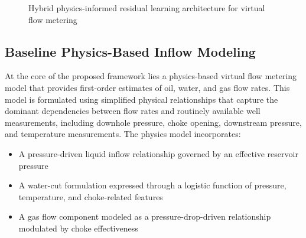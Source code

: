 \documentclass[12pt,APA]{uomthesis}
\begin{document}
\begin{figure}[!htb]
{
}
\caption{Hybrid physics-informed residual learning architecture for virtual flow metering}
\label{fig:component_architecture}
\end{figure}


\subsection{Baseline Physics-Based Inflow Modeling}
At the core of the proposed framework lies a physics-based virtual flow metering model that provides first-order estimates of oil, water, and gas flow rates. This model is formulated using simplified physical relationships that capture the dominant dependencies between flow rates and routinely available well measurements, including downhole pressure, choke opening, downstream pressure, and temperature measurements.
The physics model incorporates:

\begin{itemize}
    \item A pressure-driven liquid inflow relationship governed by an effective reservoir pressure
    \item A water-cut formulation expressed through a logistic function of pressure, temperature, and choke-related features
    \item A gas flow component modeled as a pressure-drop-driven relationship modulated by choke effectiveness
\end{itemize}
\end{document}
